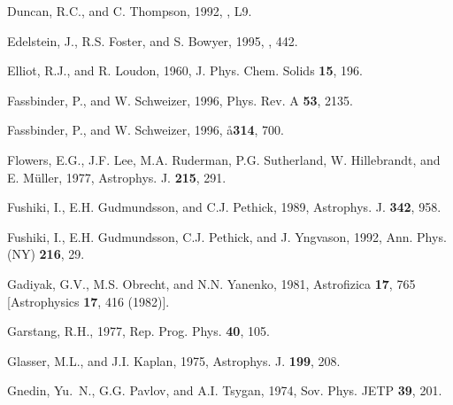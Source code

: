 \begin{references}
\harvarditem{}{}{}
Duncan, R.C., and C. Thompson, 1992, , L9.


\harvarditem{}{}{}
Edelstein, J., R.S. Foster, and S. Bowyer, 1995, , 442.


\harvarditem{}{}{}
Elliot, R.J., and R. Loudon, 1960, J. Phys. Chem. Solids 
{\bf 15}, 196.

\harvarditem{}{}{}
Fassbinder, P., and W. Schweizer, 1996, Phys. Rev. A {\bf 53}, 2135.

\harvarditem{}{}{}
Fassbinder, P., and W. Schweizer, 1996, \aa {\bf 314}, 700.

\harvarditem{}{}{}
Flowers, E.G., J.F. Lee, M.A. Ruderman, P.G. Sutherland,
W. Hillebrandt, and E. M\"uller, 1977, Astrophys. J. {\bf 215}, 291.

\harvarditem{}{}{}
Fushiki, I., E.H. Gudmundsson, and C.J. Pethick, 1989, 
Astrophys. J. {\bf 342}, 958.

\harvarditem{}{}{}
Fushiki, I., E.H. Gudmundsson, C.J. Pethick, and J. Yngvason, 1992, 
Ann. Phys. (NY) {\bf 216}, 29.

\harvarditem{}{}{}
Gadiyak, G.V., M.S. Obrecht, and N.N. Yanenko, 1981, 
Astrofizica {\bf 17}, 765 [Astrophysics {\bf 17}, 416 (1982)].

\harvarditem{}{}{}
Garstang, R.H., 1977, Rep. Prog. Phys. {\bf 40}, 105.

\harvarditem{}{}{}
Glasser, M.L., and J.I. Kaplan, 1975, Astrophys. J. {\bf 199}, 208.

\harvarditem{}{}{}
Gnedin, Yu.~N., G.G. Pavlov, and A.I. Tsygan, 1974, 
Sov. Phys. JETP {\bf 39}, 201.


\end{references}
